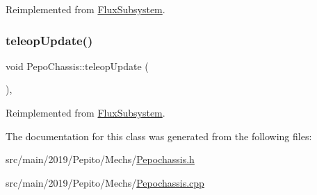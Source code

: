 Reimplemented from \hyperlink{classFluxSubsystem_aec6d05e4f80c3783684598fb92ad2e55}{Flux\+Subsystem}.

\mbox{\label{classPepoChassis_af863b7df039af7051b08c051f744e429}} 
\subsubsection{\texorpdfstring{teleop\+Update()}{teleopUpdate()}}
{\footnotesize\ttfamily void Pepo\+Chassis\+::teleop\+Update (\begin{DoxyParamCaption}{ }\end{DoxyParamCaption})\hspace{0.3cm}{\ttfamily [override]}, {\ttfamily [virtual]}}



Reimplemented from \hyperlink{classFluxSubsystem_a327d76affc60699bfa62563e364e42f5}{Flux\+Subsystem}.



The documentation for this class was generated from the following files\+:\begin{DoxyCompactItemize}
\item 
src/main/2019/\+Pepito/\+Mechs/\hyperlink{Pepochassis_8h}{Pepochassis.\+h}\item 
src/main/2019/\+Pepito/\+Mechs/\hyperlink{Pepochassis_8cpp}{Pepochassis.\+cpp}\end{DoxyCompactItemize}
